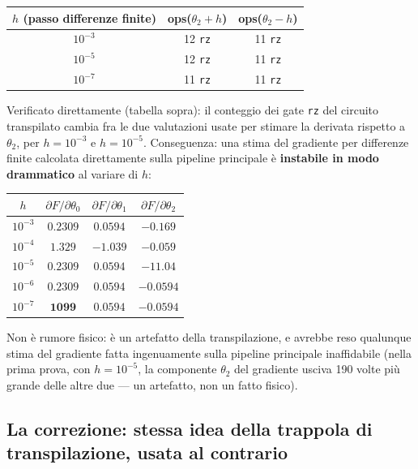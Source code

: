 \documentclass[11pt,a4paper]{article}
\begin{document}
\begin{center}
\renewcommand{\arraystretch}{1.3}
\begin{tabular}{@{}ccc@{}}
\toprule
$h$ (passo differenze finite) & ops($\theta_2+h$) & ops($\theta_2-h$)\\
\midrule
$10^{-3}$ & 12 \texttt{rz} & 11 \texttt{rz}\\
$10^{-5}$ & 12 \texttt{rz} & 11 \texttt{rz}\\
$10^{-7}$ & 11 \texttt{rz} & 11 \texttt{rz}\\
\bottomrule
\end{tabular}
\end{center}

\noindent Verificato direttamente (tabella sopra): il conteggio dei gate
\texttt{rz} del circuito transpilato cambia fra le due valutazioni usate
per stimare la derivata rispetto a $\theta_2$, per $h=10^{-3}$ e
$h=10^{-5}$. Conseguenza: una stima del gradiente per differenze finite
calcolata direttamente sulla pipeline principale è \textbf{instabile in
modo drammatico} al variare di $h$:

\begin{center}
\renewcommand{\arraystretch}{1.2}
\begin{tabular}{@{}cccc@{}}
\toprule
$h$ & $\partial F/\partial\theta_0$ & $\partial F/\partial\theta_1$ & $\partial F/\partial\theta_2$\\
\midrule
$10^{-3}$ & $0.2309$ & $0.0594$ & $-0.169$\\
$10^{-4}$ & $1.329$ & $-1.039$ & $-0.059$\\
$10^{-5}$ & $0.2309$ & $0.0594$ & $\mathbf{-11.04}$\\
$10^{-6}$ & $0.2309$ & $0.0594$ & $-0.0594$\\
$10^{-7}$ & $\mathbf{1099}$ & $0.0594$ & $-0.0594$\\
\bottomrule
\end{tabular}
\end{center}

\noindent Non è rumore fisico: è un artefatto della transpilazione, e
avrebbe reso qualunque stima del gradiente fatta ingenuamente sulla
pipeline principale inaffidabile (nella prima prova, con $h=10^{-5}$, la
componente $\theta_2$ del gradiente usciva 190 volte più grande delle
altre due --- un artefatto, non un fatto fisico).

\subsection{La correzione: stessa idea della trappola di transpilazione, usata al contrario}
\end{document}
